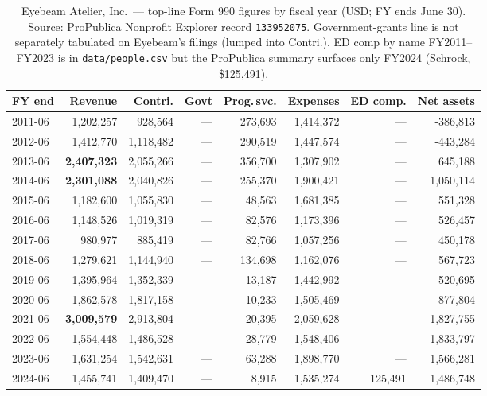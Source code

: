 \documentclass[10pt,letterpaper,twocolumn]{article}
\begin{document}
\begin{table}[t]
\footnotesize
\centering
\setlength{\tabcolsep}{4pt}
\begin{tabularx}{\textwidth}{Xrrrrrrr}
\toprule
\textbf{FY end} & \textbf{Revenue} & \textbf{Contri.} & \textbf{Govt} & \textbf{Prog.\,svc.} & \textbf{Expenses} & \textbf{ED comp.} & \textbf{Net assets} \\
\midrule
2011-06 & 1,202,257 & 928,564 & --- & 273,693 & 1,414,372 & --- & -386,813 \\
2012-06 & 1,412,770 & 1,118,482 & --- & 290,519 & 1,447,574 & --- & -443,284 \\
2013-06 & \textbf{2,407,323} & 2,055,266 & --- & 356,700 & 1,307,902 & --- & 645,188 \\
2014-06 & \textbf{2,301,088} & 2,040,826 & --- & 255,370 & 1,900,421 & --- & 1,050,114 \\
2015-06 & 1,182,600 & 1,055,830 & --- & 48,563 & 1,681,385 & --- & 551,328 \\
2016-06 & 1,148,526 & 1,019,319 & --- & 82,576 & 1,173,396 & --- & 526,457 \\
2017-06 & 980,977 & 885,419 & --- & 82,766 & 1,057,256 & --- & 450,178 \\
2018-06 & 1,279,621 & 1,144,940 & --- & 134,698 & 1,162,076 & --- & 567,723 \\
2019-06 & 1,395,964 & 1,352,339 & --- & 13,187 & 1,442,992 & --- & 520,695 \\
2020-06 & 1,862,578 & 1,817,158 & --- & 10,233 & 1,505,469 & --- & 877,804 \\
2021-06 & \textbf{3,009,579} & 2,913,804 & --- & 20,395 & 2,059,628 & --- & 1,827,755 \\
2022-06 & 1,554,448 & 1,486,528 & --- & 28,779 & 1,548,406 & --- & 1,833,797 \\
2023-06 & 1,631,254 & 1,542,631 & --- & 63,288 & 1,898,770 & --- & 1,566,281 \\
2024-06 & 1,455,741 & 1,409,470 & --- & 8,915 & 1,535,274 & 125,491 & 1,486,748 \\
\bottomrule
\end{tabularx}
\caption{Eyebeam Atelier, Inc.~--- top-line Form 990 figures by fiscal year (USD; FY ends June 30). Source: ProPublica Nonprofit Explorer record \texttt{133952075}. Government-grants line is not separately tabulated on Eyebeam's filings (lumped into Contri.). ED comp by name FY2011--FY2023 is in \texttt{data/people.csv} but the ProPublica summary surfaces only FY2024 (Schrock, \$125,491).}
\label{tab:financials}
\end{table}
\end{document}
